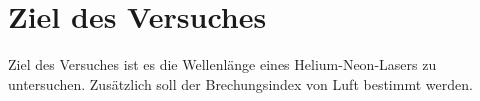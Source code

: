 \section{Ziel des Versuches}
\label{sec:versuchsziel}

Ziel des Versuches ist es die Wellenlänge eines Helium-Neon-Lasers zu untersuchen. Zusätzlich soll der Brechungsindex von Luft bestimmt werden.